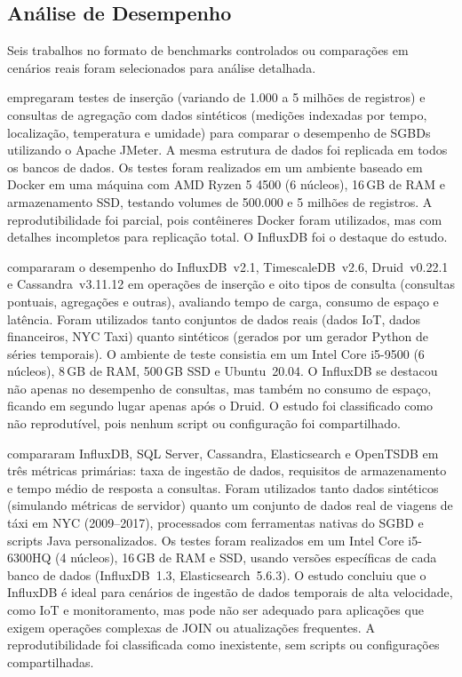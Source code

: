 \subsection{Análise de Desempenho}

Seis trabalhos no formato de benchmarks controlados ou comparações em cenários reais foram
selecionados para análise detalhada.

\cite{lima2024avaliando} empregaram testes de inserção (variando de 1.000 a 5 milhões de
registros) e consultas de agregação com dados sintéticos (medições indexadas por tempo,
localização, temperatura e umidade) para comparar o desempenho de SGBDs utilizando o Apache
JMeter. A mesma estrutura de dados foi replicada em todos os bancos de dados. Os testes foram
realizados em um ambiente baseado em Docker em uma máquina com AMD Ryzen 5 4500 (6 núcleos),
16\,GB de RAM e armazenamento SSD, testando volumes de 500.000 e 5 milhões de registros. A
reprodutibilidade foi parcial, pois contêineres Docker foram utilizados, mas com detalhes
incompletos para replicação total. O InfluxDB foi o destaque do estudo.

\cite{shah2022performance} compararam o desempenho do InfluxDB~v2.1, TimescaleDB~v2.6,
Druid~v0.22.1 e Cassandra~v3.11.12 em operações de inserção e oito tipos de consulta
(consultas pontuais, agregações e outras), avaliando tempo de carga, consumo de espaço e
latência. Foram utilizados tanto conjuntos de dados reais (dados IoT, dados financeiros, NYC
Taxi) quanto sintéticos (gerados por um gerador Python de séries temporais). O ambiente de
teste consistia em um Intel Core i5-9500 (6 núcleos), 8\,GB de RAM, 500\,GB SSD e
Ubuntu~20.04. O InfluxDB se destacou não apenas no desempenho de consultas, mas também no
consumo de espaço, ficando em segundo lugar apenas após o Druid. O estudo foi classificado
como não reprodutível, pois nenhum script ou configuração foi compartilhado.

\cite{naqvi2017influxdb} compararam InfluxDB, SQL Server, Cassandra, Elasticsearch e OpenTSDB
em três métricas primárias: taxa de ingestão de dados, requisitos de armazenamento e tempo
médio de resposta a consultas. Foram utilizados tanto dados sintéticos (simulando métricas de
servidor) quanto um conjunto de dados real de viagens de táxi em NYC (2009--2017), processados
com ferramentas nativas do SGBD e scripts Java personalizados. Os testes foram realizados em
um Intel Core i5-6300HQ (4 núcleos), 16\,GB de RAM e SSD, usando versões específicas de cada
banco de dados (InfluxDB~1.3, Elasticsearch~5.6.3). O estudo concluiu que o InfluxDB é ideal
para cenários de ingestão de dados temporais de alta velocidade, como IoT e monitoramento, mas
pode não ser adequado para aplicações que exigem operações complexas de JOIN ou atualizações
frequentes. A reprodutibilidade foi classificada como inexistente, sem scripts ou configurações
compartilhadas.

